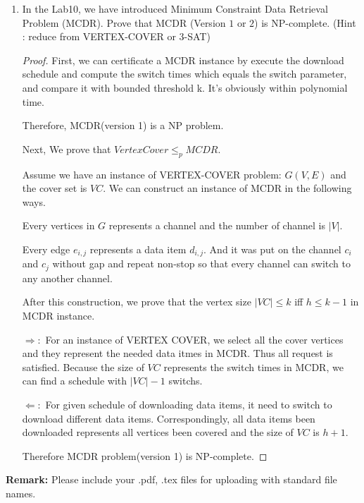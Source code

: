 \documentclass[12pt,a4paper]{article}
\theoremstyle{definition}
\begin{document}
\begin{enumerate}
\begin{proof}
	   Thus $$NAE-4-SAT\le_pNAE-3-SAT$$

	   And NAE-3-SAT is easy to check in polynomial time.

	   Therefore NAE-3-SAT is NP-complete.
	\end{proof}

	\item In the Lab10, we have introduced Minimum Constraint Data Retrieval Problem (MCDR). Prove that MCDR (Version $1$ or $2$) is NP-complete. (Hint : reduce from VERTEX-COVER or $3$-SAT)
	    \begin{proof}
		
		First, we can certificate a MCDR instance by execute the download schedule and compute the switch times which equals the switch parameter, and compare it with bounded threshold k. It's obviously within polynomial time.

		Therefore, MCDR(version 1) is a NP problem.

		Next, We prove that $Vertex Cover\le_p MCDR$.

		Assume we have an instance of VERTEX-COVER problem: $G(V,E)$ and the cover set is $VC$. We can construct an instance of MCDR in the following ways.

		Every vertices in $G$ represents a channel and the number of channel is $|V|$.

		Every edge $e_{i,j}$ represents a data item $d_{i,j}$. And it was put on the channel $c_i$ and $c_j$ without gap and repeat non-stop so that every channel can switch to any another channel.

		After this construction, we prove that the vertex size $|VC|\le k$ iff $h\le k-1$ in MCDR instance.

		$\Rightarrow:$ For an instance of VERTEX COVER, we select all the cover vertices and they represent the needed data itmes in MCDR. Thus all request is satisfied. Because the size of $VC$ represents the switch times in MCDR, we can find a schedule with $|VC|-1$ switchs.

		$\Leftarrow:$ For given schedule of downloading data items, it need to switch to download different data items. Correspondingly, all data items been downloaded represents all vertices been covered and the size of $VC$ is $h+1$.

		Therefore MCDR problem(version 1) is NP-complete. 
	
		
	\end{proof}

\end{enumerate}

\textbf{Remark:} Please include your .pdf, .tex files for uploading with standard file names.




\end{document}
